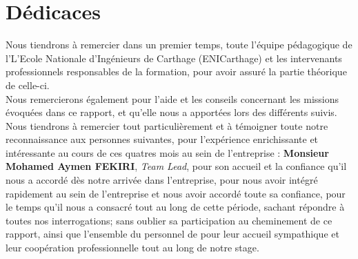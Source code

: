 \chapter*{\Huge Dédicaces}

Nous tiendrons à remercier dans un premier temps, toute l’équipe pédagogique de
l’L'Ecole Nationale d'Ingénieurs de Carthage (ENICarthage) et les intervenants professionnels responsables de la formation, pour avoir assuré la partie théorique de celle-ci.\\
Nous remercierons également\textbf{ \@academicFramerName } pour l’aide et les conseils concernant les missions évoquées dans ce rapport, et qu’elle nous a apportées lors des différents suivis.\\
Nous tiendrons à remercier tout particulièrement et à témoigner toute notre reconnaissance aux personnes suivantes, pour l’expérience enrichissante et intéressante au cours de ces quatres mois au sein de l’entreprise \@companyName : \textbf{Monsieur Mohamed Aymen FEKIRI}, \textit{Team Lead}, pour son accueil et la confiance qu’il nous a accordé dès notre arrivée dans l’entreprise, pour nous avoir intégré rapidement au sein de l’entreprise et nous avoir accordé toute sa confiance, pour le temps qu’il nous a consacré tout au long de cette période, sachant répondre à toutes nos interrogations; sans oublier sa participation au cheminement de ce rapport, ainsi que l’ensemble du personnel de \@companyName pour leur accueil sympathique et leur coopération professionnelle tout au long de notre stage.

\vspace{8mm}
\begin{flushright}
    \LARGE \@author
\end{flushright}